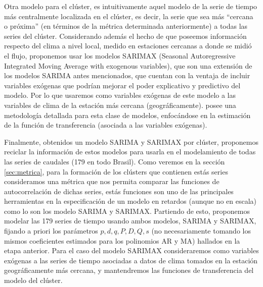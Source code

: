 \documentclass[12pt,oneside]{book}\usepackage[]{graphicx}\usepackage[]{color}
\theoremstyle{definition} %
\begin{document}
Otra modelo para el clúster, es intuitivamente aquel modelo de la serie de tiempo más centralmente localizada en el clúster, es decir, la serie que sea más ``cercana o próxima'' (en términos de la métrica determinada anteriormente) a todas las series del clúster. 
Considerando además el hecho de que poseemos información respecto del clima a nivel local, medido en estaciones cercanas a donde se midió el flujo, proponemos usar los modelos SARIMAX (Seasonal Autoregressive Integrated Moving Average with exogenous variables), que son una extensión de los modelos SARIMA antes mencionados, que cuentan con la ventaja de incluir variables exógenas que podrían mejorar el poder explicativo y predictivo del modelo. 
Por lo que usaremos como variables exógenas de este modelo a las variables de clima de la estación más cercana (geográficamente). \citeauthor{novales1993econometria} \citeyear{novales1993econometria} posee una metodología detallada para esta clase de modelos, enfocándose en la estimación de la función de transferencia (asociada a las variables exógenas). 





Finalmente, obtenidos un modelo SARIMA y SARIMAX por clúster, proponemos reciclar la información de estos modelos para usarla en el modelamiento de todas las series de caudales (179 en todo Brasil). %
Como veremos en la sección \ref{sec:metrica}, para la formación de los clústers que contienen estás series consideramos una métrica que nos permita comparar las funciones de autocorrelación de dichas series, estás funciones son uno de las principales herramientas en la especificación de un modelo en retardos (aunque no en escala) como lo son los modelo SARIMA y SARIMAX. 
Partiendo de esto, proponemos modelar las 179 series de tiempo usando ambos modelos, SARIMA y SARIMAX, fijando a priori los parámetros $p,d,q,P,D,Q,s$ (no necesariamente tomando los mismos coeficientes estimados para los polinomios AR y MA) hallados en la etapa anterior. Para el caso del modelo SARIMAX consideraremos  como variables exógenas a las series de tiempo asociadas a datos de clima tomados en la estación geográficamente más cercana, y mantendremos las funciones de transferencia del modelo del clúster.  
\end{document}
